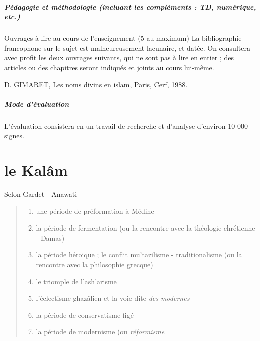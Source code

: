 \paragraph{Pédagogie et méthodologie (incluant les compléments : TD, numérique, etc.)}




Ouvrages à lire au cours de l’enseignement (5 au maximum)
La bibliographie francophone sur le sujet est malheureusement lacunaire, et datée. On consultera avec profit les deux ouvrages suivants, qui ne sont pas à lire en entier ; des articles ou des chapitres seront indiqués et joints au cours lui-même.
\cite{Gardet:IntroductionTheoMusulmane}


D. GIMARET, Les noms divins en islam, Paris, Cerf, 1988.

\paragraph{Mode d’évaluation}
L’évaluation consistera en un travail de recherche et d’analyse d’environ 10 000 signes.


\chapter{le Kalâm}

Selon Gardet - Anawati
\begin{quote}
    \begin{enumerate}
        \item une période de préformation à Médine
        \item la période de fermentation (ou la rencontre avec la théologie chrétienne - Damas)
        \item la période héroique ; le conflit mu'tazilisme - traditionalisme (ou la rencontre avec la philosophie grecque)
        \item le triomple de l'ash'arisme
        \item l'éclectisme ghazâlien et la voie dite \textit{des modernes}
        \item la période de conservatisme figé
        \item la période de modernisme (ou \textit{réformisme}
    \end{enumerate}
\end{quote}